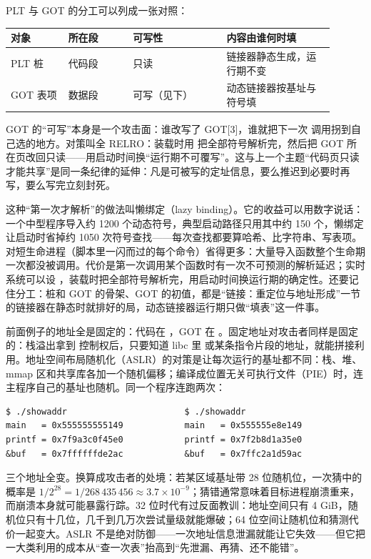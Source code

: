 PLT 与 GOT 的分工可以列成一张对照：

\begin{longtable}{L{0.16\linewidth}L{0.18\linewidth}L{0.26\linewidth}L{0.30\linewidth}}
\toprule
对象 & 所在段 & 可写性 & 内容由谁何时填 \\
\midrule
PLT 桩 & 代码段 & 只读 & 链接器静态生成，运行期不变 \\\tablerowrule
GOT 表项 & 数据段 & 可写（见下） & 动态链接器按基址与符号填 \\
\bottomrule
\end{longtable}

GOT 的“可写”本身是一个攻击面：谁改写了 GOT[3]，谁就把下一次  调用拐到自己选的地方。对策叫全 RELRO：装载时用  把全部符号解析完，然后把 GOT 所在页改回只读——用启动时间换“运行期不可覆写”。这与上一个主题“代码页只读才能共享”是同一条纪律的延伸：凡是可被写的定址信息，要么推迟到必要时再写，要么写完立刻封死。

这种“第一次才解析”的做法叫懒绑定（lazy binding）。它的收益可以用数字说话：一个中型程序导入约 1200 个动态符号，典型启动路径只用其中约 150 个，懒绑定让启动时省掉约 1050 次符号查找——每次查找都要算哈希、比字符串、写表项。对短生命进程（脚本里一闪而过的每个命令）省得更多：大量导入函数整个生命期一次都没被调用。代价是第一次调用某个函数时有一次不可预测的解析延迟；实时系统可以设 ，装载时把全部符号解析完，用启动时间换运行期的确定性。还要记住分工：桩和 GOT 的骨架、GOT 的初值，都是“链接：重定位与地址形成”一节的链接器在静态时就排好的局，动态链接器运行期只做“填表”这一件事。

前面例子的地址全是固定的：代码在 ，GOT 在 。固定地址对攻击者同样是固定的：栈溢出拿到  控制权后，只要知道 libc 里  或某条指令片段的地址，就能拼接利用。地址空间布局随机化（ASLR）的对策是让每次运行的基址都不同：栈、堆、mmap 区和共享库各加一个随机偏移；编译成位置无关可执行文件（PIE）时，连主程序自己的基址也随机。同一个程序连跑两次：

\begin{lstlisting}
$ ./showaddr                       $ ./showaddr
main   = 0x555555555149            main   = 0x555555e8e149
printf = 0x7f9a3c0f45e0            printf = 0x7f2b8d1a35e0
&buf   = 0x7ffffffde2ac            &buf   = 0x7ffc2a1d59ac
\end{lstlisting}

三个地址全变。换算成攻击者的处境：若某区域基址带 28 位随机位，一次猜中的概率是 $1/2^{28}=1/268\,435\,456\approx3.7\times10^{-9}$；猜错通常意味着目标进程崩溃重来，而崩溃本身就可能暴露行踪。32 位时代有过反面教训：地址空间只有 4 GiB，随机位只有十几位，几千到几万次尝试量级就能爆破；64 位空间让随机位和猜测代价一起变大。ASLR 不是绝对防御——一次地址信息泄漏就能让它失效——但它把一大类利用的成本从“查一次表”抬高到“先泄漏、再猜、还不能错”。

